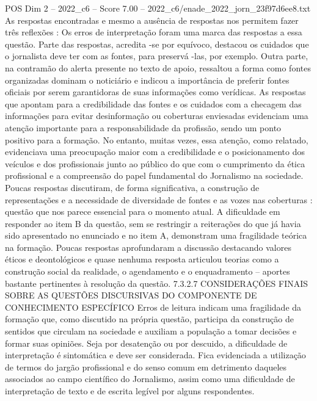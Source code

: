 \begin{textsample}{POS Dim 2 – 2022\_c6 – Score 7.00 – 2022\_c6/enade\_2022\_jorn\_23f97d6ee8.txt}
As respostas encontradas e mesmo a ausência de respostas nos permitem fazer três reflexões : Os erros de interpretação foram uma marca das respostas a essa questão.
Parte das respostas, acredita -se por equívoco, destacou os cuidados que o jornalista deve ter com as fontes, para preservá -las, por exemplo.
Outra parte, na contramão do alerta presente no texto de apoio, ressaltou a forma como fontes organizadas dominam o noticiário e indicou a importância de preferir fontes oficiais por serem garantidoras de suas informações como verídicas.
As respostas que apontam para a credibilidade das fontes e os cuidados com a checagem das informações para evitar desinformação ou coberturas enviesadas evidenciam uma atenção importante para a responsabilidade da profissão, sendo um ponto positivo para a formação.
No entanto, muitas vezes, essa atenção, como relatado, evidenciava uma preocupação maior com a credibilidade e o posicionamento dos veículos e dos profissionais junto ao público do que com o cumprimento da ética profissional e a compreensão do papel fundamental do Jornalismo na sociedade.
Poucas respostas discutiram, de forma significativa, a construção de representações e a necessidade de diversidade de fontes e as vozes nas coberturas : questão que nos parece essencial para o momento atual.
A dificuldade em responder ao item B da questão, sem se restringir a reiterações do que já havia sido apresentado no enunciado e no item A, demonstram uma fragilidade teórica na formação.
Poucas respostas aprofundaram a discussão destacando valores éticos e deontológicos e quase nenhuma resposta articulou teorias como a construção social da realidade, o agendamento e o enquadramento – aportes bastante pertinentes à resolução da questão. 7.3.2.7 CONSIDERAÇÕES FINAIS SOBRE AS QUESTÕES DISCURSIVAS DO COMPONENTE DE CONHECIMENTO ESPECÍFICO Erros de leitura indicam uma fragilidade da formação que, como discutido na própria questão, participa da construção de sentidos que circulam na sociedade e auxiliam a população a tomar decisões e formar suas opiniões.
Seja por desatenção ou por descuido, a dificuldade de interpretação é sintomática e deve ser considerada.
Fica evidenciada a utilização de termos do jargão profissional e do senso comum em detrimento daqueles associados ao campo científico do Jornalismo, assim como uma dificuldade de interpretação de texto e de escrita legível por alguns respondentes.

\end{textsample}
